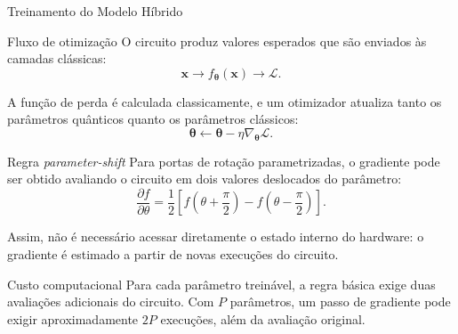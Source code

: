 \begin{frame}[shrink=20]{Treinamento do Modelo Híbrido}

\begin{block}{Fluxo de otimização}
O circuito produz valores esperados que são enviados às camadas clássicas:
\[
\mathbf{x}
\longrightarrow
f_{\boldsymbol{\theta}}(\mathbf{x})
\longrightarrow
\mathcal{L}.
\]

A função de perda é calculada classicamente, e um otimizador atualiza tanto
os parâmetros quânticos quanto os parâmetros clássicos:
\[
\boldsymbol{\theta}
\leftarrow
\boldsymbol{\theta}
-
\eta\nabla_{\boldsymbol{\theta}}\mathcal{L}.
\]
\end{block}

\begin{block}{Regra \textit{parameter-shift}}
Para portas de rotação parametrizadas, o gradiente pode ser obtido
avaliando o circuito em dois valores deslocados do parâmetro:
\[
\frac{\partial f}{\partial \theta}
=
\frac{1}{2}
\left[
f\left(\theta+\frac{\pi}{2}\right)
-
f\left(\theta-\frac{\pi}{2}\right)
\right].
\]

Assim, não é necessário acessar diretamente o estado interno do hardware:
o gradiente é estimado a partir de novas execuções do circuito.
\end{block}

\begin{alertblock}{Custo computacional}
Para cada parâmetro treinável, a regra básica exige duas avaliações
adicionais do circuito. Com $P$ parâmetros, um passo de gradiente pode
exigir aproximadamente $2P$ execuções, além da avaliação original.
\end{alertblock}

\end{frame}

